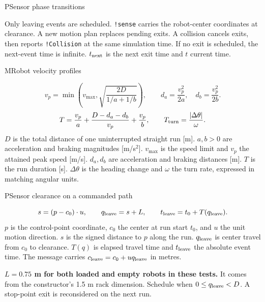 \begin{frame}{PSensor phase transitions}
\centering\resizebox{!}{4.2cm}{\PSensorDiagram}
\par\medskip\raggedright\small
Only leaving events are scheduled. \texttt{!sense} carries the robot-center coordinates at clearance.
A new motion plan replaces pending exits.
A collision cancels exits, then reports \texttt{!Collision} at the same simulation time.
If no exit is scheduled, the next-event time is infinite. $t_{\rm next}$ is the next exit time and $t$ current time.
\end{frame}

\begin{frame}{MRobot velocity profiles}
\begin{center}\resizebox{.82\linewidth}{!}{\Profiles}\end{center}
\[
v_p=\min\!\left(v_{\max},\sqrt{\frac{2D}{1/a+1/b}}\right),
\qquad d_a=\frac{v_p^2}{2a},\quad d_b=\frac{v_p^2}{2b}.
\]
\[
T=\frac{v_p}{a}+\frac{D-d_a-d_b}{v_p}+\frac{v_p}{b},
\qquad T_{\rm turn}=\frac{|\Delta\theta|}{\omega}.
\]
\footnotesize
$D$ is the total distance of one uninterrupted straight run [m].
$a,b>0$ are acceleration and braking magnitudes [m/s$^2$].
$v_{\max}$ is the speed limit and $v_p$ the attained peak speed [m/s].
$d_a,d_b$ are acceleration and braking distances [m].
$T$ is the run duration [s]. $\Delta\theta$ is the heading change
and $\omega$ the turn rate, expressed in matching angular units.
\end{frame}

\begin{frame}{PSensor clearance on a commanded path}

\begin{center}
\end{center}

\[
s=(p-c_0)\cdot u,\qquad q_{\rm leave}=s+L,\qquad
t_{\rm leave}=t_0+T(q_{\rm leave}).
\]
\footnotesize
$p$ is the control-point coordinate, $c_0$ the center at run start $t_0$,
and $u$ the unit motion direction. $s$ is the signed distance to $p$ along the run.
$q_{\rm leave}$ is center travel from $c_0$ to clearance.
$T(q)$ is elapsed travel time and $t_{\rm leave}$ the absolute event time.
The message carries $c_{\rm leave}=c_0+u q_{\rm leave}$ in metres.
\par\medskip
\textbf{$L=0.75$ m for both loaded and empty robots in these tests.}
It comes from the constructor's 1.5 m rack dimension.
Schedule when $0\le q_{\rm leave}<D$.
A stop-point exit is reconsidered on the next run.

\end{frame}

